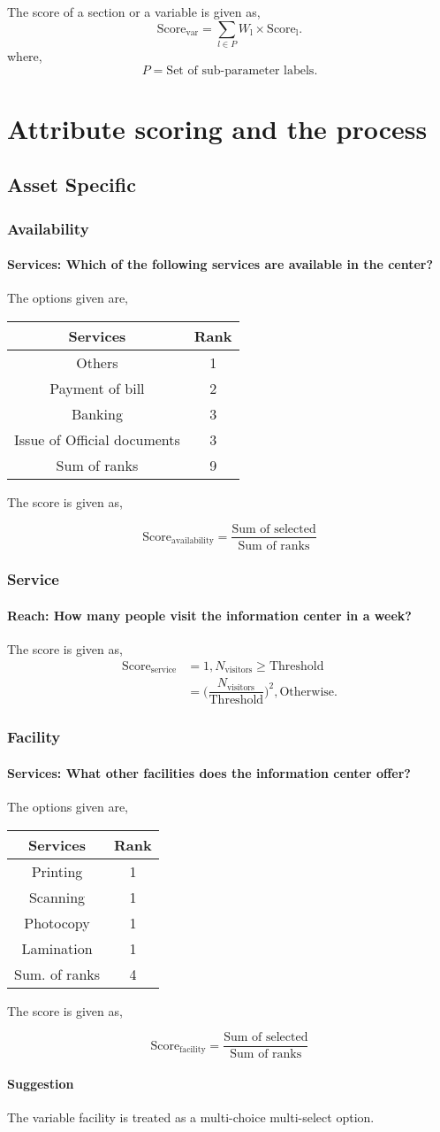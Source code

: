 \documentclass[oneside,twocolumn]{article}
\newcommand{\tsub}[2]{\text{#1}_{\text{#2}}}
\newcommand{\tsubb}[2]{#1_{\text{#2}}}
\newcommand{\dsub}[2]{\dfrac{\text{#1}}{\text{#2}}}
\newcommand{\multsel}[1]
{
	\[
		\tsub{Score}{#1} = \dsub{Sum of selected}{Sum of ranks}
	\]
}
\newenvironment{ttable}
{
\begin{center}
\begin{tabular}{c|c}
\hline
}
{
\\ \hline
\end{tabular}
\end{center}
}
\begin{document}
The score of a section or a variable is given as,
\[
	\tsub{Score}{var} = \sum_{l \in P} \tsubb{W}{l} \times \tsub{Score}{l}.
\]
where,
\[
	P = \text{Set of sub-parameter labels.}
\]	

\section{Attribute scoring and the process}
\subsection{Asset Specific}
\subsubsection{Availability}
\paragraph{Services: Which of the following services are available in the center?}
The options given are,
\begin{ttable}
	Services & Rank \\ \hline
	Others & 1 \\
	Payment of bill & 2 \\
	Banking & 3 \\
	Issue of Official documents & 3 \\ \hline
	Sum of ranks & 9
\end{ttable}
The score is given as,
\multsel{availability}
\subsubsection{Service}
\paragraph{Reach: How many people visit the information center in a week?} 
The score is given as,
\begin{align*}
	\tsub{Score}{service} &= 1, \tsubb{N}{visitors} \ge \text{Threshold} \\
	&= \Big( \dfrac{\tsubb{N}{visitors}}{\text{Threshold}} \Big)^{2}, \text{Otherwise}.
\end{align*}

\subsubsection{Facility}
\paragraph{Services: What other facilities does the information center offer?}
The options given are,
\begin{ttable}
	Services & Rank \\ \hline
	Printing & 1 \\
	Scanning & 1 \\
	Photocopy & 1 \\
	Lamination & 1 \\ \hline
	Sum. of ranks & 4
\end{ttable}
The score is given as,
\multsel{facility}
\paragraph{Suggestion} The variable facility is treated as a multi-choice multi-select option.
\end{document}

